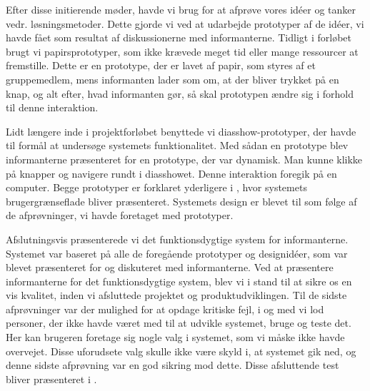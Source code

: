 Efter disse initierende møder, havde vi brug for at afprøve vores idéer og tanker vedr. løsningsmetoder. Dette gjorde vi ved at udarbejde prototyper af de idéer, vi havde fået som resultat af diskussionerne med informanterne. Tidligt i forløbet brugt vi papirsprototyper, som ikke krævede meget tid eller mange ressourcer at fremstille. Dette er en prototype, der er lavet af papir, som styres af et gruppemedlem, mens informanten lader som om, at der bliver trykket på en knap, og alt efter, hvad informanten gør, så skal prototypen ændre sig i forhold til denne interaktion.

Lidt længere inde i projektforløbet benyttede vi diasshow-prototyper, der havde til formål at undersøge systemets funktionalitet. Med sådan en prototype blev informanterne præsenteret for en prototype, der var dynamisk. Man kunne klikke på knapper og navigere rundt i diasshowet. Denne interaktion foregik på en computer. Begge prototyper er forklaret yderligere i , hvor systemets brugergrænseflade bliver præsenteret. Systemets design er blevet til som følge af de afprøvninger, vi havde foretaget med prototyper.

Afslutningsvis præsenterede vi det funktionsdygtige system for informanterne. Systemet var baseret på alle de foregående prototyper og designidéer, som var blevet præsenteret for og diskuteret med informanterne. Ved at præsentere informanterne for det funktionsdygtige system, blev vi i stand til at sikre os en vis kvalitet, inden vi afsluttede projektet og produktudviklingen. Til de sidste afprøvninger var der mulighed for at opdage kritiske fejl, i og med vi lod personer, der ikke havde været med til at udvikle systemet, bruge og teste det. Her kan brugeren foretage sig nogle valg i systemet, som vi måske ikke havde overvejet. Disse uforudsete valg skulle ikke være skyld i, at systemet gik ned, og denne sidste afprøvning var en god sikring mod dette. Disse afsluttende test bliver præsenteret i .



